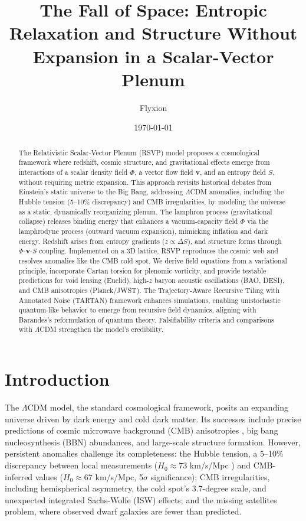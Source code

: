 \documentclass[11pt]{article}
\title{The Fall of Space: Entropic Relaxation and Structure Without Expansion in a Scalar-Vector Plenum}
\author{Flyxion}
\date{\today}
\theoremstyle{plain}
\theoremstyle{definition}
\begin{document}
\maketitle

\begin{abstract}
The Relativistic Scalar-Vector Plenum (RSVP) model proposes a cosmological framework where redshift, cosmic structure, and gravitational effects emerge from interactions of a scalar density field $\Phi$, a vector flow field $\bm{v}$, and an entropy field $S$, without requiring metric expansion. This approach revisits historical debates from Einstein’s static universe to the Big Bang, addressing $\Lambda$CDM anomalies, including the Hubble tension (5--10\% discrepancy) and CMB irregularities, by modeling the universe as a static, dynamically reorganizing plenum. The lamphron process (gravitational collapse) releases binding energy that enhances a vacuum-capacity field $\Phi$ via the lamphrodyne process (outward vacuum expansion), mimicking inflation and dark energy. Redshift arises from entropy gradients ($z \propto \Delta S$), and structure forms through $\Phi$-$\bm{v}$-$S$ coupling. Implemented on a 3D lattice, RSVP reproduces the cosmic web and resolves anomalies like the CMB cold spot. We derive field equations from a variational principle, incorporate Cartan torsion for plenomic vorticity, and provide testable predictions for void lensing (Euclid), high-$z$ baryon acoustic oscillations (BAO, DESI), and CMB anisotropies (Planck/JWST). The Trajectory-Aware Recursive Tiling with Annotated Noise (TARTAN) framework enhances simulations, enabling unistochastic quantum-like behavior to emerge from recursive field dynamics, aligning with Barandes’s reformulation of quantum theory. Falsifiability criteria and comparisons with $\Lambda$CDM strengthen the model’s credibility.
\end{abstract}

\section{Introduction}
\label{sec:introduction}
The $\Lambda$CDM model, the standard cosmological framework, posits an expanding universe driven by dark energy and cold dark matter. Its successes include precise predictions of cosmic microwave background (CMB) anisotropies \citep{Planck2018}, big bang nucleosynthesis (BBN) abundances, and large-scale structure formation. However, persistent anomalies challenge its completeness: the Hubble tension, a 5--10\% discrepancy between local measurements ($H_0 \approx 73$ km/s/Mpc \citep{Riess2022}) and CMB-inferred values ($H_0 \approx 67$ km/s/Mpc, 5$\sigma$ significance); CMB irregularities, including hemispherical asymmetry, the cold spot’s 3.7-degree scale, and unexpected integrated Sachs-Wolfe (ISW) effects; and the missing satellites problem, where observed dwarf galaxies are fewer than predicted.
\end{document}
